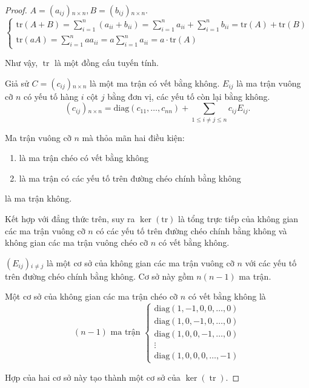 \begin{proof}
    $A = (a_{ij}){}_{n\times n}, B = (b_{ij}){}_{n\times n}$.
    \[
        \begin{cases}
            \text{tr}(A+B) = \displaystyle\sum^{n}_{i=1}(a_{ii}+b_{ii}) = \displaystyle\sum^{n}_{i=1}a_{ii} + \displaystyle\sum^{n}_{i=1}b_{ii} = \text{tr}(A) + \text{tr}(B) \\
            \text{tr}(aA) = \displaystyle\sum^{n}_{i=1}aa_{ii} = a\displaystyle\sum^{n}_{i=1}a_{ii} = a\cdot\text{tr}(A)
        \end{cases}
    \]
    
    Như vậy, $\operatorname{tr}$ là một đồng cấu tuyến tính.
    
    Giả sử $C = (c_{ij}){}_{n\times n}$ là một ma trận có vết bằng không. $E_{ij}$ là ma trận vuông cỡ $n$ có yếu tố hàng $i$ cột $j$ bằng đơn vị, các yếu tố còn lại bằng không.
    \[
        (c_{ij}){}_{n\times n} = \text{diag}(c_{11}, \ldots, c_{nn}) + \sum_{1\le i\ne j\le n}c_{ij}E_{ij}.
    \]
    
    Ma trận vuông cỡ $n$ mà thỏa mãn hai điều kiện:
    \begin{enumerate}[label = (\roman*)]
        \item là ma trận chéo có vết bằng không
        \item là ma trận có các yếu tố trên đường chéo chính bằng không
    \end{enumerate}
    
    là ma trận không.
    
    Kết hợp với đẳng thức trên, suy ra $\ker(\text{tr})$ là tổng trực tiếp của không gian các ma trận vuông cỡ $n$ có các yếu tố trên đường chéo chính bằng không và không gian các ma trận vuông chéo cỡ $n$ có vết bằng không.
    
    \bigskip
    
    $(E_{ij}){}_{i\ne j}$ là một cơ sở của không gian các ma trận vuông cỡ $n$ với các yếu tố trên đường chéo chính bằng không. Cơ sở này gồm $n(n-1)$ ma trận.
    
    Một cơ sở của không gian các ma trận chéo cỡ $n$ có vết bằng không là
    \[
        (n-1)\text{ ma trận }
        \begin{cases}
            \text{diag}(1, -1, 0,  0,\ldots,  0) \\
            \text{diag}(1, 0, -1,  0,\ldots,  0) \\
            \text{diag}(1, 0,  0, -1,\ldots,  0) \\
            \vdots                               \\
            \text{diag}(1, 0,  0,  0,\ldots, -1)
        \end{cases}
    \]
    
    Hợp của hai cơ sở này tạo thành một cơ sở của $\ker(\operatorname{tr})$.
\end{proof}

